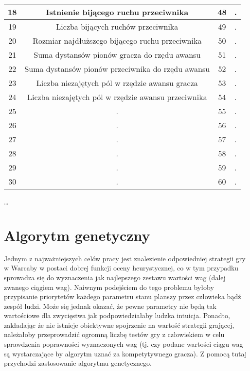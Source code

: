 {\begin{center}
\begin{tabular}{|c | c || c | c|}
 \hline
 18 & Istnienie bijącego ruchu przeciwnika & 48 & . \\
 \hline
 19 & Liczba bijących ruchów przeciwnika & 49 & . \\
 \hline
 20 & Rozmiar najdłuższego bijącego ruchu przeciwnika & 50 & . \\
 \hline
 21 & Suma dystansów pionów gracza do rzędu awansu & 51 & . \\ 
 \hline
 22 & Suma dystansów pionów przeciwnika do rzędu awansu & 52 & . \\
 \hline
 23 & Liczba niezajętych pól w rzędzie awansu gracza & 53 & . \\
 \hline
 24 & Liczba niezajętych pól w rzędzie awansu przeciwnika & 54 & . \\
 \hline
 25 & . & 55 & . \\
 \hline
 26 & . & 56 & . \\ 
 \hline
 27 & . & 57 & . \\
 \hline
 28 & . & 58 & . \\
 \hline
 29 & . & 59 & . \\
 \hline
 30 & . & 60 & . \\
 \hline
\end{tabular}
\end{center}
}

\ldots

\section{Algorytm genetyczny}

Jednym z najważniejszych celów pracy jest znalezienie odpowiedniej strategii gry w Warcaby w postaci dobrej funkcji oceny heurystycznej, co w tym przypadku sprowadza się do wyznaczenia jak najlepszego zestawu wartości wag (dalej zwanego ciągiem wag). Naiwnym podejściem do tego problemu byłoby przypisanie priorytetów każdego parametru stanu planszy przez człowieka bądź zespół ludzi. Może się jednak okazać, że pewne parametry nie będą tak wartościowe dla zwycięstwa jak podpowiedziałaby ludzka intuicja. Ponadto, zakładając że nie istnieje obiektywne spojrzenie na wartość strategii grającej, należałoby przeprowadzić ogromną liczbę testów gry z człowiekiem w celu sprawdzenia poprawności wyznaczonych wag (tj. czy podane wartości ciągu wag są wystarczające by algorytm uznać za kompetytywnego gracza). Z pomocą tutaj przychodzi zastosowanie algorytmu genetycznego.

